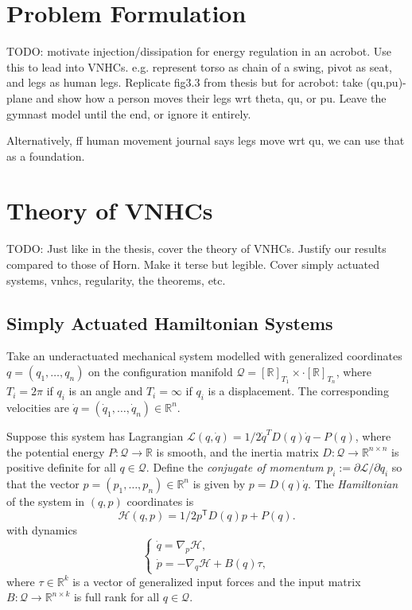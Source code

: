 \documentclass[journal,twoside,web]{ieeecolor}
\newcommand*{\tpose}{^\mathsf{T}}
\newcommand*{\Rt}[1]{[\R]_{#1}}
\newcommand*{\R}{\mathbb{R}}
\begin{document}
\section{Problem Formulation}\label{sec:problem-formulation}
TODO: motivate injection/dissipation for energy regulation in an acrobot. Use
this to lead into VNHCs. e.g. represent torso as chain of a swing, pivot as
seat, and legs as human legs. Replicate fig3.3 from thesis but for acrobot: take
(qu,pu)-plane and show how a person moves their legs wrt theta, qu, or pu. Leave
the gymnast model until the end, or ignore it entirely.

Alternatively, ff human movement journal says legs move wrt qu, we can use that
as a foundation.

\section{Theory of VNHCs}\label{sec:vnhc}
TODO: Just like in the thesis, cover the theory of VNHCs. Justify our results compared
to those of Horn. Make it terse but legible. Cover simply actuated systems,
vnhcs, regularity, the theorems, etc.


\subsection{Simply Actuated Hamiltonian Systems}
Take an underactuated mechanical system modelled with generalized coordinates 
\(q = (q_1, \ldots, q_n)\) on the configuration manifold
\(\mathcal{Q} = \Rt{T_1} \times \cdot \Rt{T_n}\), where
\(T_i = 2\pi\) if \(q_i\) is an angle and \(T_i = \infty\) if \(q_i\) is a
displacement. The corresponding velocities are 
\(\dot{q} = (\dot{q}_1,\ldots,\dot{q}_n) \in \R^n\).

Suppose this system has Lagrangian
\(\mathcal{L}(q,\dot{q}) = 1/2 \dot{q}^T D(q) \dot{q} - P(q)\),
where the potential energy 
\(P : \mathcal{Q} \rightarrow \mathbb{R}\) 
is smooth, and the inertia matrix 
\(D : \mathcal{Q} \rightarrow \mathbb{R}^{n \times n}\)
is positive definite for all \(q \in \mathcal{Q}\).
Define the \textit{conjugate of momentum} 
\(p_i := \partial\mathcal{L}/\partial\dot{q}_i\) so that the vector 
\(p = (p_1,\ldots,p_n) \in \R^n\) is given by \(p = D(q)\dot{q}\).
The \textit{Hamiltonian} of the system in \((q,p)\) coordinates
is\cite{landau_mechanics}
\begin{equation}\label{eqn:hamiltonian}
    \mathcal{H}(q,p) = 1/2 p\tpose D(q) p + P(q).
\end{equation}
with dynamics
\begin{equation}\label{eqn:hamiltonian-eom-general}
    \begin{cases}
        \dot{q} = \nabla_p\mathcal{H} 
        , \\
        \dot{p} = -\nabla_q\mathcal{H} + B(q) \tau
        ,
    \end{cases}
\end{equation}
where \(\tau \in \R^k\) is a vector of generalized input forces and the input
matrix \(B : \mathcal{Q} \rightarrow \R^{n \times k}\) is full rank for all 
\(q \in \mathcal{Q}\).
\end{document}
